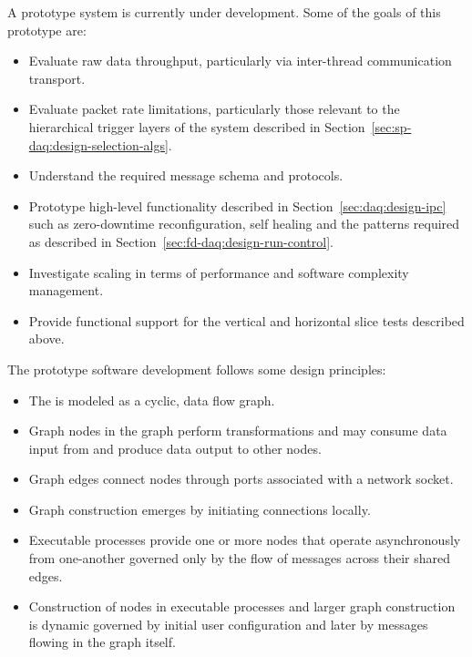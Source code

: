 
\label{sec:fd-daq:validation-demonstrators}


A prototype  system is currently under development. 
Some of the goals of this prototype are:

\begin{itemize}
\item Evaluate raw data throughput, particularly via inter-thread communication transport.
\item Evaluate packet rate limitations, particularly those relevant to the hierarchical trigger layers of the  system described in Section~\ref{sec:sp-daq:design-selection-algs}.
\item Understand the required message schema and protocols.
\item Prototype high-level functionality described in Section~\ref{sec:daq:design-ipc} such as zero-downtime reconfiguration, self healing and the patterns required  as described in Section~\ref{sec:fd-daq:design-run-control}.
\item Investigate scaling in terms of performance and software complexity management.
\item Provide functional support for the vertical and horizontal slice tests described above.
\end{itemize}

The prototype software development follows some design principles:

\begin{itemize}
\item The  is modeled as a cyclic, data flow graph.
\item Graph nodes in the graph perform transformations and may consume data input from and produce data output to other nodes.
\item Graph edges connect nodes through ports associated with a network socket.
\item Graph construction emerges by initiating connections locally.
\item Executable processes provide one or more nodes that operate asynchronously from one-another governed only by the flow of messages across their shared edges.
\item Construction of nodes in executable processes and larger graph construction is dynamic governed by initial user configuration and later by messages flowing in the graph itself.
\end{itemize}

